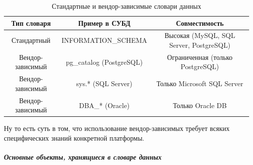 \begin{table}[H]
    \centering
    \begin{tabular}{|c|c|c|}
        \hline
        \textbf{Тип словаря} & \textbf{Пример в СУБД} & \textbf{Совместимость} \\
        \hline
        Стандартный & INFORMATION\_SCHEMA & Высокая (MySQL, SQL Server, PostgreSQL) \\
        \hline
        Вендор-зависимый & pg\_catalog (PostgreSQL) & Ограниченная (только PostgreSQL) \\
        \hline
        Вендор-зависимый & sys.* (SQL Server) & Только Microsoft SQL Server \\
        \hline
        Вендор-зависимый & DBA\_* (Oracle) & Только Oracle DB \\
        \hline
    \end{tabular}
    \caption{Стандартные и вендор-зависимые словари данных}
    \label{tab:data_dictionary_comparison}
\end{table}

Ну то есть суть в том, что использование вендор-зависимых требует всяких специфических знаний конкретной платформы.

\subparagraph{Основные объекты, хранящиеся в словаре данных}

